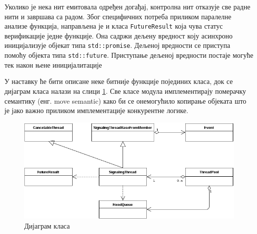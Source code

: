 \documentclass[12pt,oneside]{memoir}
\begin{document}
Уколико је нека нит емитовала одређен догађај, контролна нит отказује све радне нити и завршава са радом.
Због специфичних потреба приликом паралелне анализе функција, направљена је и класа \texttt{FutureResult} која чува статус верификације једне функције. Она садржи дељену вредност коју асинхроно иницијализује објекат типа \texttt{std::promise}. Дељеној вредности се приступа помоћу објекта типа \texttt{std::future}. Приступање дељеној вредности постаје могуће тек након њене иницијалитације


У наставку ће бити описане неке битније функције појединих класа, док се дијаграм класа налази на слици \ref{fig:klasa_dij}. Све класе модула имплементирају померачку семантику (енг. move semantic) како би се онемогућило копирање објеката што је јако важно приликом имплементације конкурентне логике. 

 \begin{figure}[!ht]
  \centering
  \includegraphics[width=1.0\textwidth]{img/class_diag.png}
  \caption{Дијаграм класа}
  \label{fig:klasa_dij}
\end{figure}
\end{document}
